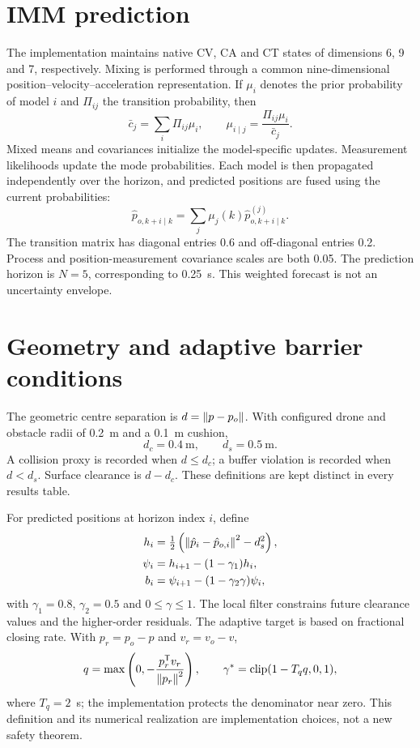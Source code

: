\section{IMM prediction}
The implementation maintains native CV, CA and CT states of dimensions 6, 9 and 7, respectively. Mixing is performed through a common nine-dimensional position--velocity--acceleration representation. If $\mu_i$ denotes the prior probability of model $i$ and $\Pi_{ij}$ the transition probability, then
\begin{equation}
\bar c_j=\sum_i\Pi_{ij}\mu_i,\qquad
\mu_{i\mid j}=\frac{\Pi_{ij}\mu_i}{\bar c_j}.
\end{equation}
Mixed means and covariances initialize the model-specific updates. Measurement likelihoods update the mode probabilities. Each model is then propagated independently over the horizon, and predicted positions are fused using the current probabilities:
\begin{equation}
\hat p_{o,k+i\mid k}=\sum_j\mu_j(k)\hat p^{(j)}_{o,k+i\mid k}.
\end{equation}
The transition matrix has diagonal entries 0.6 and off-diagonal entries 0.2. Process and position-measurement covariance scales are both 0.05. The prediction horizon is $N=5$, corresponding to 0.25~s. This weighted forecast is not an uncertainty envelope.

\section{Geometry and adaptive barrier conditions}
The geometric centre separation is $d=\left\lVert p-p_o\right\rVert$. With configured drone and obstacle radii of 0.2~m and a 0.1~m cushion,
\begin{equation}
d_c=0.4\ \mathrm{m},\qquad d_s=0.5\ \mathrm{m}.
\end{equation}
A collision proxy is recorded when $d\leq d_c$; a buffer violation is recorded when $d<d_s$. Surface clearance is $d-d_c$. These definitions are kept distinct in every results table.

For predicted positions at horizon index $i$, define
\begin{align}
h_i&=\tfrac12\left(\left\lVert\hat p_i-\hat p_{o,i}\right\rVert^2-d_s^2\right),\\
\psi_i&=h_{i+1}-(1-\gamma_1)h_i,\\
b_i&=\psi_{i+1}-(1-\gamma_2\gamma)\psi_i,
\end{align}
with $\gamma_1=0.8$, $\gamma_2=0.5$ and $0\leq\gamma\leq1$. The local filter constrains future clearance values and the higher-order residuals. The adaptive target is based on fractional closing rate. With $p_r=p_o-p$ and $v_r=v_o-v$,
\begin{equation}
q=\max\left(0,-\frac{p_r^\mathsf{T}v_r}{\left\lVert p_r\right\rVert^2}\right),\qquad
\gamma^*=\operatorname{clip}(1-T_q q,0,1),
\end{equation}
where $T_q=2$~s; the implementation protects the denominator near zero. This definition and its numerical realization are implementation choices, not a new safety theorem.

